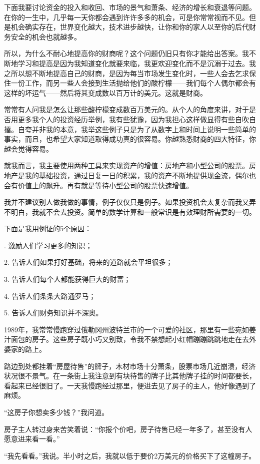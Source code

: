 下面我要讨论资金的投入和收回、市场的景气和萧条、经济的增长和衰退等问题。在你的一生中，几乎每一天你都会遇到许许多多的机会，可是你常常视而不见。但是机会确实存在，世界变化越大，技术进步越快，让你和你的家人以至你的后代财务安全的机会也就越多。

所以，为什么不耐心地提高你的财商呢？这个问题仍旧只有你才能给出答案。我不断地学习和提高是因为我知道变化就要来临，我更欢迎变化而不是沉溺于过去。我之所以想不断地提高自己的财商，是因为每当市场发生变化时，一些人会去乞求保住一份工作，而另一些人会接到生活抛给他们的酸柠檬——我们每个人偶尔都会有这样的坏运气——然后将其变成数以百万计的美元。这就是财商。

常常有人问我是怎么让那些酸柠檬变成数百万美元的。从个人的角度来讲，对于是否用更多我个人的投资经历举例，我有些犹豫，因为我担心这样做显得有些自吹自擂。自夸并非我的本意，我举这些例子只是为了从数字上和时间上说明一些简单的事实，而且，也希望大家知道取得成功真的很容易。你越熟悉财商的四大特征，你越会觉得容易。

就我而言，我主要使用两种工具来实现资产的增值：房地产和小型公司的股票。房地产是我的基础投资，通过日复一日的积累，我的资产不断地提供现金流，偶尔也会有价值上的飙升。再有就是等待小型公司的股票快速增值。

我并不建议别人做我做的事情，例子仅仅只是例子。如果投资机会太复杂而我又弄不明白，我就不会去投资。简单的数学计算和一般常识是有效理财所需要的一切。

下面是我用例证的5个原因：

{. 激励人们学习更多的知识；

2. 告诉人们如果打好基础，将来的道路就会平坦很多；

3. 告诉人们每个人都能获得巨大的财富；

4. 告诉人们条条大路通罗马；

5. 告诉人们财务知识并不深奥。}

1989年，我常常慢跑穿过俄勒冈州波特兰市的一个可爱的社区，那里有一些宛如姜汁面包的房子。这些房子既小巧又别致，令我不禁想起小红帽蹦蹦跳跳地走在去外婆家的路上。

路边到处都挂着“房屋待售”的牌子，木材市场十分萧条，股票市场几近崩溃，经济状况很不景气。在一条街上我注意到有块待售的牌子比其他牌子挂的时间都要长，看起来已经很旧了。一天我慢跑经过那里，便进去见了房子的主人，他好像遇到了麻烦。

“这房子你想卖多少钱？”我问道。

房子主人转过身来苦笑着说：“你报个价吧，房子待售已经一年多了，甚至没有人愿意进来看一看。”

“我先看看。”我说。半小时之后，我就以低于要价2万美元的价格买下了这幢房子。

